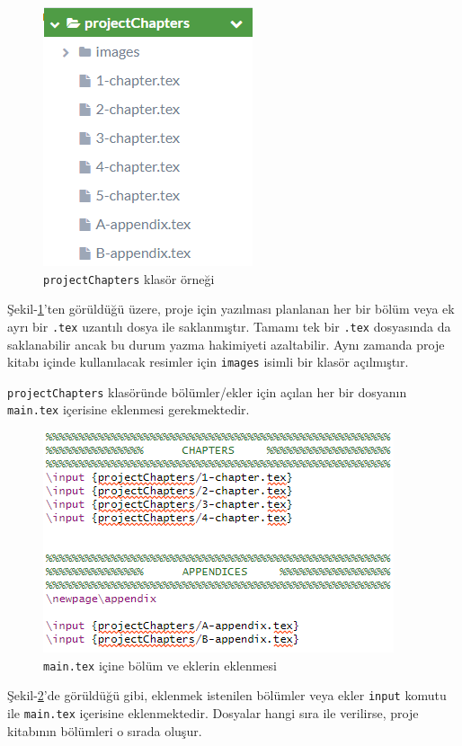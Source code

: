\begin{figure}[!ht]
  \centering
  \includegraphics{zkilavuz/bolumlerekler}
  \caption{\texttt{projectChapters} klasör örneği}
  \label{fig:bolumlerekler}
\end{figure}

Şekil-\ref{fig:bolumlerekler}'ten görüldüğü üzere, proje için yazılması planlanan her bir bölüm veya ek ayrı bir \texttt{.tex} uzantılı dosya ile saklanmıştır. Tamamı tek bir \texttt{.tex} dosyasında da saklanabilir ancak bu durum yazma hakimiyeti azaltabilir. Aynı zamanda proje kitabı içinde kullanılacak resimler için \texttt{images} isimli bir klasör açılmıştır. 

\texttt{projectChapters} klasöründe bölümler/ekler için açılan her bir dosyanın \texttt{main.tex} içerisine eklenmesi gerekmektedir. 

\begin{figure}[!ht]
  \centering
  \includegraphics{zkilavuz/mainekleme}
  \caption{\texttt{main.tex} içine bölüm ve eklerin eklenmesi}
  \label{fig:mainekleme}
\end{figure}

Şekil-\ref{fig:mainekleme}'de görüldüğü gibi, eklenmek istenilen bölümler veya ekler \texttt{input} komutu ile \texttt{main.tex} içerisine eklenmektedir. Dosyalar hangi sıra ile verilirse, proje kitabının bölümleri o sırada oluşur.

